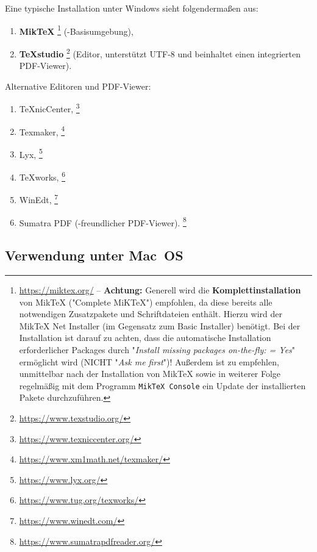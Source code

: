 Eine typische Installation unter Windows sieht folgendermaßen aus:
%
\begin{enumerate}
\item \textbf{MikTeX}%
	\footnote{\url{https://miktex.org/} -- \textbf{Achtung:} 
	Generell wird die \textbf{Komplettinstallation} von MikTeX ("Complete MiKTeX") empfohlen, 
	da diese bereits alle notwendigen Zusatzpakete und Schriftdateien enthält. Hierzu wird der
	MikTeX Net Installer (im Gegensatz zum Basic Installer) benötigt.
	Bei der Installation ist darauf zu achten, 
	dass die automatische Installation erforderlicher Packages 
	durch "\emph{Install missing packages on-the-fly: = Yes}" ermöglicht wird (NICHT "\emph{Ask me first}")!
	Außerdem ist zu empfehlen, unmittelbar nach der Installation von MikTeX sowie in weiterer Folge regelmäßig
	mit dem Programm \texttt{MikTeX Console} ein Update der installierten Pakete durchzuführen.}
	(\latex-Basisumgebung),
\item \textbf{TeXstudio}%
	\footnote{\url{https://www.texstudio.org/}}
	(Editor, unterstützt UTF-8 und beinhaltet einen integrierten PDF-Viewer).
\end{enumerate}
%
Alternative Editoren und PDF-Viewer:
%
\begin{enumerate}
	\item TeXnicCenter,%
	\footnote{\url{https://www.texniccenter.org/}}
	\item Texmaker,%
	\footnote{\url{https://www.xm1math.net/texmaker/}}
	\item Lyx,%
	\footnote{\url{https://www.lyx.org/}}
	\item TeXworks,%
	\footnote{\url{https://www.tug.org/texworks/}}
	\item WinEdt,%
	\footnote{\url{https://www.winedt.com/}}
	\item Sumatra PDF (\latex-freundlicher PDF-Viewer).%
	\footnote{\url{https://www.sumatrapdfreader.org/}}
\end{enumerate}

\subsection{Verwendung unter Mac~OS}

